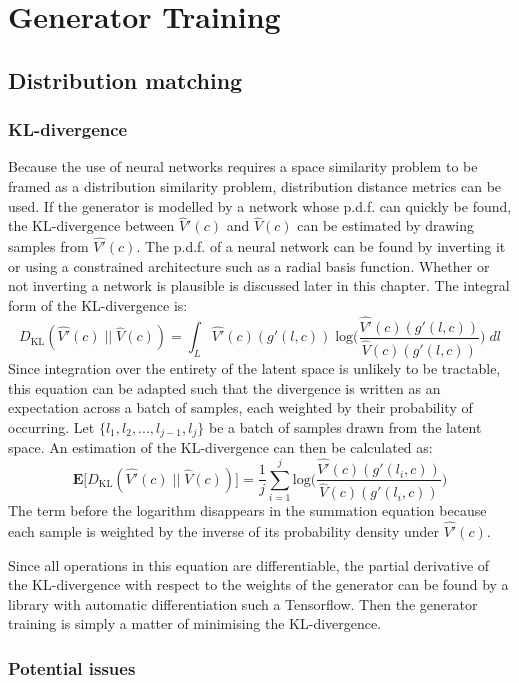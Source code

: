 \documentclass[../../main.tex]{subfiles}
\begin{document}
\chapter{Generator Training}

\section{Distribution matching}

\subsection{KL-divergence}

Because the use of neural networks requires a space similarity problem to be framed as a distribution similarity problem, distribution distance metrics can be used.
If the generator is modelled by a network whose p.d.f. can quickly be found, the KL-divergence between $\hat{V}'(c)$ and $\hat{V}(c)$ can be estimated by drawing samples from $\hat{V'}(c)$.
The p.d.f. of a neural network can be found by inverting it or using a constrained architecture such as a radial basis function.
Whether or not inverting a network is plausible is discussed later in this chapter.
The integral form of the KL-divergence is:
$$D_{\text{KL}}(\hat{V'}(c) \; || \; \hat{V}(c)) = 
\int_L \hat{V'}(c)(g'(l, c)) \; \text{log} \bigg(\frac
{\hat{V'}(c)(g'(l, c))}{\hat{V}(c)(g'(l, c))}
\bigg) \; dl $$
Since integration over the entirety of the latent space is unlikely to be tractable, this equation can be adapted such that the divergence is written as an expectation across a batch of samples, each weighted by their probability of occurring.
Let $\{l_1, l_2, ..., l_{j-1}, l_j\}$ be a batch of samples drawn from the latent space.
An estimation of the KL-divergence can then be calculated as:
$$\textbf{E}\big[D_{\text{KL}}(\hat{V'}(c) \; || \; \hat{V}(c))\big] =
\frac{1}{j}\sum_{i=1}^{j}
\text{log} \bigg(\frac
{\hat{V'}(c)(g'(l_i, c))}{\hat{V}(c)(g'(l_i, c))}
\bigg)
$$
The term before the logarithm disappears in the summation equation because each sample is weighted by the inverse of its probability density under $\hat{V'}(c)$.

Since all operations in this equation are differentiable, the partial derivative of the KL-divergence with respect to the weights of the generator can be found by a library with automatic differentiation such a Tensorflow.
Then the generator training is simply a matter of minimising the KL-divergence.

\subsection{Potential issues}
\end{document}
